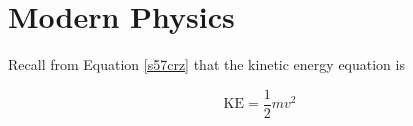 \documentclass[main.tex]{subfiles}
\begin{document}
\section{Modern Physics}

Recall from Equation \eqref{s57crz} that the kinetic energy equation is

\begin{equation}
    \text{KE} = \frac{1}{2} m v^2
\end{equation}
\end{document}
